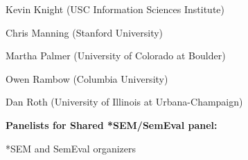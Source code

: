 \begin{description}
  Kevin Knight (USC \/ Information Sciences Institute)

  Chris Manning (Stanford University)

  Martha Palmer (University of Colorado at Boulder)

  Owen Rambow (Columbia University)

  Dan Roth (University of Illinois at Urbana-Champaign)


\item{\bf Panelists for Shared *SEM/SemEval panel:  }

*SEM and SemEval organizers

\end{description}

